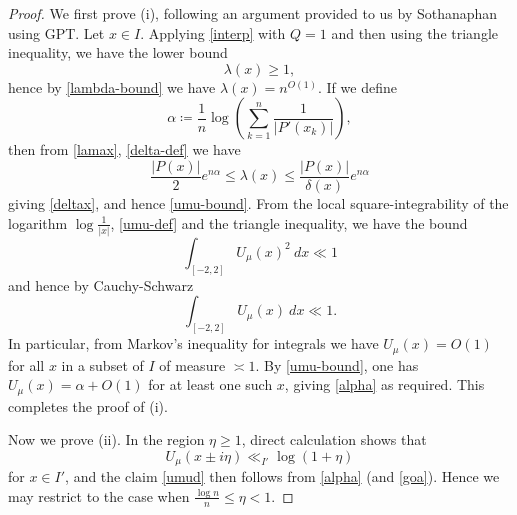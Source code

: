 \documentclass[12pt]{amsart}
\begin{document}
\begin{proof} We first prove (i), following an argument provided to us by Sothanaphan \cite{gpt} using GPT.  Let $x \in I$.
Applying \eqref{interp} with $Q=1$ and then using the triangle inequality, we have the lower bound
\begin{equation}\label{lambda-lower}
\lambda(x) \geq 1,
\end{equation}
hence by \eqref{lambda-bound} we have $\lambda(x) = n^{O(1)}$.
If we define
\begin{equation}\label{alpha-def}
 \alpha \coloneqq \frac{1}{n} \log \left(\sum_{k=1}^n \frac{1}{|P'(x_k)|}\right),
\end{equation}
then from \eqref{lamax}, \eqref{delta-def} we have
$$ \frac{|P(x)|}{2} e^{n\alpha} \leq \lambda(x) \leq \frac{|P(x)|}{\delta(x)} e^{n\alpha}$$
giving \eqref{deltax}, and hence \eqref{umu-bound}.  From the local square-integrability of the logarithm $\log \frac{1}{|x|}$, \eqref{umu-def} and the triangle inequality, we have the bound
\begin{equation}\label{umisc}
 \int_{[-2,2]} U_\mu(x)^2\ dx \ll 1
\end{equation}
and hence by Cauchy-Schwarz
\begin{equation}\label{ul1}
\int_{[-2,2]} U_\mu(x)\ dx \ll 1.
\end{equation}
In particular, from Markov's inequality for integrals we have $U_\mu(x) = O(1)$ for all $x$ in a subset of $I$ of measure $\asymp 1$.  By \eqref{umu-bound}, one has $U_\mu(x) = \alpha + O(1)$ for at least one such $x$, giving \eqref{alpha} as required. This completes the proof of (i).

Now we prove (ii). In the region $\eta \geq 1$, direct calculation shows that
$$ U_\mu(x \pm i\eta) \ll_{I'} \log ( 1 + \eta )$$
for $x \in I'$, and the claim \eqref{umud} then follows from \eqref{alpha} (and \eqref{goa}).  Hence we may restrict to the case when $\frac{\log n}{n} \leq \eta < 1$.


\end{proof}
\end{document}
